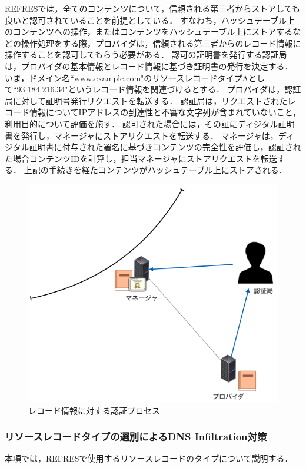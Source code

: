 REFRESでは，全てのコンテンツについて，信頼される第三者からストアしても良いと認可されていることを前提としている．
すなわち，ハッシュテーブル上のコンテンツへの操作，またはコンテンツをハッシュテーブル上にストアするなどの操作処理をする際，プロバイダは，信頼される第三者からのレコード情報に操作することを認可してもらう必要がある．
認可の証明書を発行する認証局は，プロバイダの基本情報とレコード情報に基づき証明書の発行を決定する．
いま，ドメイン名``www.example.com"のリソースレコードタイプAとして``93.184.216.34"というレコード情報を関連づけるとする．
プロバイダは，認証局に対して証明書発行リクエストを転送する．
認証局は，リクエストされたレコード情報についてIPアドレスの到達性と不審な文字列が含まれていないこと，利用目的について評価を施す．
認可された場合には，その証にディジタル証明書を発行し，マネージャにストアリクエストを転送する．
マネージャは，ディジタル証明書に付与された署名に基づきコンテンツの完全性を評価し，認証された場合コンテンツIDを計算し，担当マネージャにストアリクエストを転送する．
上記の手続きを経たコンテンツがハッシュテーブル上にストアされる．

\begin{figure}[h]
 \centering
 \includegraphics[scale=0.5]{figure/certificate-procedure.png}
 \caption{レコード情報に対する認証プロセス}
 \label{fig:manager-provider}
\end{figure}

\subsubsection{リソースレコードタイプの選別によるDNS Infiltration対策}
本項では，REFRESで使用するリソースレコードのタイプについて説明する．

